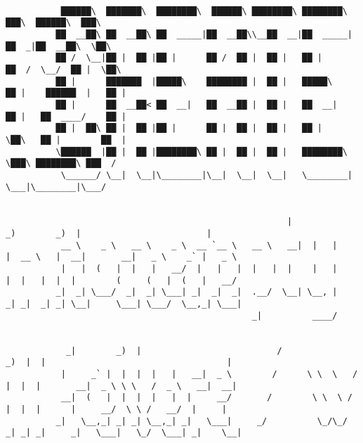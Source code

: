 \documentclass[varwidth=\maxdimen,margin=0.5cm,multi={verbatim}]{standalone}
\begin{document}
\begin{verbatim}

           ██████\  ███████\  ████████\  ██████\ ████████\ ████████\      ███\  ██████\  ███\
          ██  __██\ ██  __██\ ██  _____|██  __██\\__██  __|██  _____|    ██  _|██  __██\  \██\
          ██ /  \__|██ |  ██ |██ |      ██ /  ██ |  ██ |   ██ |         ██  /  \__/  ██ |  \██\
          ██ |      ███████  |█████\    ████████ |  ██ |   █████\       ██ |    ██████  |   ██ |
          ██ |      ██  __██< ██  __|   ██  __██ |  ██ |   ██  __|      ██ |   ██  ____/    ██ |
          ██ |  ██\ ██ |  ██ |██ |      ██ |  ██ |  ██ |   ██ |         \██\   ██ |        ██  |
          \██████  |██ |  ██ |████████\ ██ |  ██ |  ██ |   ████████\     \███\ ████████\ ███  /
           \______/ \__|  \__|\________|\__|  \__|  \__|   \________|      \___|\________|\___/


                                                        |              _)        _)  |                         |
           __ \    _ \   __ \    _ \  __ `__ \   __ \   __|  |   |      |  __ \   |  __|       __|   _ \    _` |   _ \
           |   |  (   |  |   |   __/  |   |   |  |   |  |    |   |      |  |   |  |  |        (     (   |  (   |   __/
          _|  _| \___/  _|  _| \___| _|  _|  _|  .__/  \__| \__, |     _| _|  _| _| \__|     \___| \___/  \__,_| \___|
                                                 _|          ____/


            _|        _)  |                           /                _)  |  |                                    |
           |     _` |  |  |  |   |   __|  _ \        /      \ \  \   /  |  |  |       __|  _ \ \ \   /  _ \   __|  __|
           __|  (   |  |  |  |   |  |     __/       /        \ \  \ /   |  |  |      |     __/  \ \ /   __/  |     |
          _|   \__,_| _| _| \__,_| _|   \___|     _/          \_/\_/   _| _| _|     _|   \___|   \_/  \___| _|    \__|



\end{verbatim}
\end{document}
